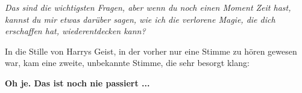 \emph{Das sind die wichtigsten Fragen, aber wenn du noch einen Moment Zeit hast,
kannst du mir etwas darüber sagen, wie ich die verlorene Magie, die dich
erschaffen hat, wiederentdecken kann?}

In die Stille von Harrys Geist, in der vorher nur eine Stimme zu hören gewesen
war, kam eine zweite, unbekannte Stimme, die sehr besorgt klang:

\textbf{\glqq{}Oh je. Das ist noch nie passiert ...\grqq{}}